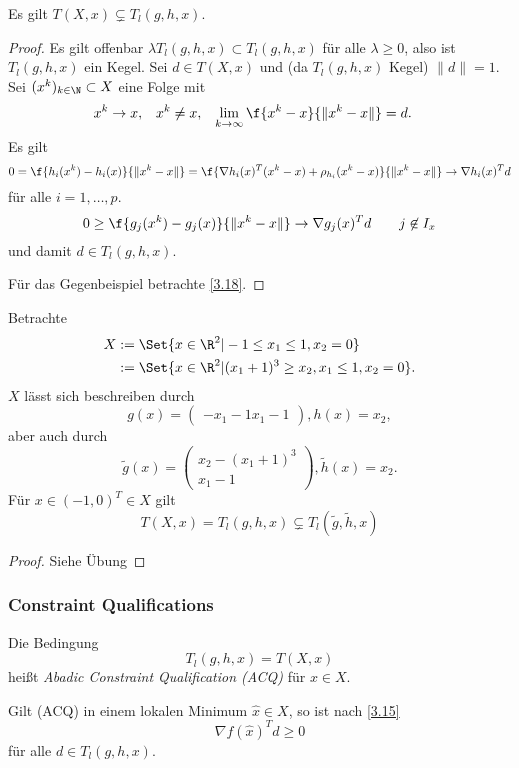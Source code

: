 \begin{lem} \label{3.17}
	Es gilt $T(X, x) \subsetneq T_l(g,h,x)$.
	\begin{proof}
		Es gilt offenbar $\lambda T_l(g,h,x) \subset T_l(g,h,x)$ für alle $\lambda \ge 0$, also ist $T_l(g,h,x)$ ein Kegel.
		Sei $d \in T(X,x)$ und \oBdA (da $T_l(g,h,x)$ Kegel) $\|d\| = 1$.
		Sei $(x^k)_{k\in \N} \subset X$ eine Folge mit
		\begin{align*}
			x^k &\to x, &
			x^k &\neq x, &
			\lim_{k\to\infty} \f{x^k - x}{\|x^k-x\|} &= d.
		\end{align*}
		Es gilt
		\[
			0
			= \f{h_i(x^k) - h_i(x)}{\|x^k - x\|}
			= \f{\nabla h_i(x)^T(x^k-x) + \rho_{h_i}(x^k-x)}{\|x^k-x\|}
			\to \nabla h_i(x)^T d
		\]
		für alle $i = 1, \dotsc, p$.
		\[
			0
			\ge \f{g_j(x^k) - g_j(x)}{\|x^k-x\|}
			\to \nabla g_j(x)^T d
			\qquad j \not\in I_x
		\]
		und damit $d \in T_l(g,h,x)$.

		Für das Gegenbeispiel betrachte \ref{3.18}.
	\end{proof}
\end{lem}

\begin{ex} \label{3.18}
	Betrachte
	\begin{align*}
		X &:= \Set{ x \in \R^2 | -1 \le x_1 \le 1, x_2 = 0 } \\
		&:= \Set{ x \in \R^2 | (x_1 + 1)^3 \ge x_2, x_1 \le 1, x_2 = 0 }.
	\end{align*}
	$X$ lässt sich beschreiben durch
	\[
		g(x) = \begin{pmatrix}
			- x_1 - 1
			x_1 - 1
		\end{pmatrix},
		h(x) = x_2,
	\]
	aber auch durch
	\[
		\tilde g(x) = \begin{pmatrix}
			x_2 - (x_1 + 1)^3 \\
			x_1 - 1
		\end{pmatrix},
		\tilde h(x) = x_2.
	\]
	Für $x \in (-1, 0)^T \in X$ gilt
	\[
		T(X, x) = T_l(g,h,x) \subsetneq T_l(\tilde g, \tilde h, x)
	\]
	\begin{proof}
		Siehe Übung
	\end{proof}
\end{ex}

\subsubsection{Constraint Qualifications}

\begin{df} \label{3.19}
	Die Bedingung
	\begin{equation*} \label{acq} \tag{ACQ}
		T_l(g,h,x) = T(X,x)
	\end{equation*}
	heißt \emph{Abadic Constraint Qualification (ACQ)} für $x \in X$.

	Gilt (ACQ) in einem lokalen Minimum $\hat x \in X$, so ist nach \ref{3.15}
	\[
		\nabla f(\hat x)^T d \ge 0
	\]
	für alle $d \in T_l(g,h,x)$.
\end{df}

